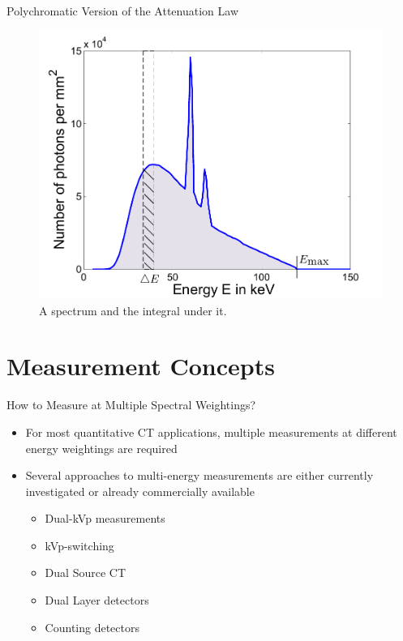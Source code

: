 \begin{frame}[c]{Polychromatic Version of the Attenuation Law}
    \begin{figure}
        \begin{centering}
            \includegraphics[width=0.5\linewidth]{images/PolychromaticModel.pdf}\caption{\label{fig:Poly}A spectrum and the integral under it.}
            \par\end{centering}
    \end{figure}
\end{frame}




\section{Measurement Concepts}

\begin{frame}[c]{How to Measure at Multiple Spectral Weightings?}
    \begin{itemize}
        \setlength\itemsep{0.4cm}
        \item For most quantitative CT applications, multiple measurements at different energy weightings are required
        \item Several approaches to multi-energy measurements are either currently investigated or already commercially available
              \begin{itemize}
                  \item Dual-kVp measurements
                  \item kVp-switching
                  \item Dual Source CT
                  \item Dual Layer detectors
                  \item Counting detectors
              \end{itemize}
    \end{itemize}
\end{frame}

